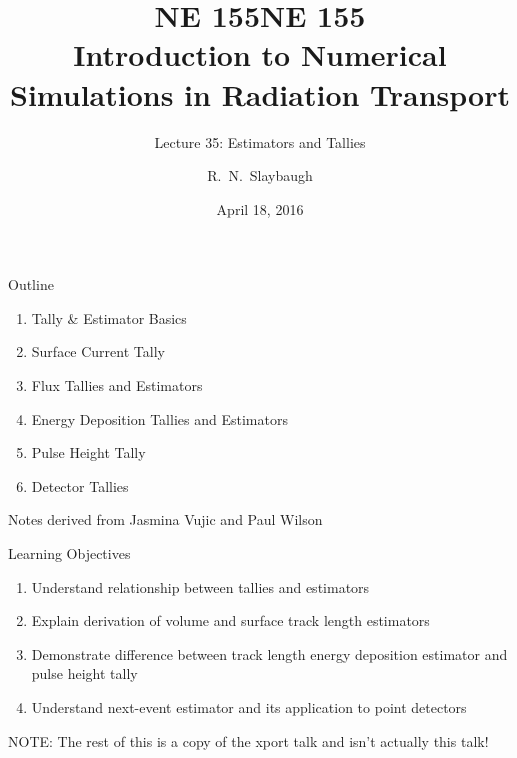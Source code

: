 \documentclass[xcolor=x11names,compress]{beamer}
\title{NE 155}
\author{R.\ N.\ Slaybaugh}
\date{April 18, 2016}
\renewcommand{\(}{\begin{columns}}
\renewcommand{\)}{\end{columns}}
\newcommand{\<}[1]{\begin{column}{#1}}
\renewcommand{\>}{\end{column}}
\begin{document}
\begin{frame}
\title{NE 155\\Introduction to Numerical Simulations in Radiation Transport}
\subtitle{Lecture 35: Estimators and Tallies}
\titlepage
\end{frame}


\begin{frame}{Outline}

    \begin{enumerate}
    \item Tally \& Estimator Basics
    \item Surface Current Tally
    \item Flux Tallies and Estimators
    \item Energy Deposition Tallies and Estimators
    \item Pulse Height Tally
    \item Detector Tallies
    \end{enumerate}

\vspace*{1em}
Notes derived from Jasmina Vujic and Paul Wilson
\end{frame}



\begin{frame}{Learning Objectives}

    \begin{enumerate}
    \item Understand relationship between tallies
and estimators
    \item Explain derivation of volume and
surface track length estimators
    \item Demonstrate difference between track
length energy deposition estimator and
pulse height tally
    \item Understand next-event estimator and
its application to point detectors
    \end{enumerate}

NOTE: The rest of this is a copy of the xport talk and isn't actually this talk!

\end{frame}
\end{document}
